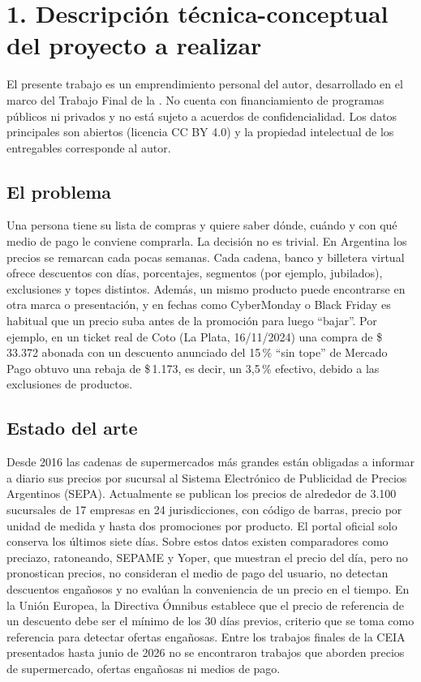 \documentclass[
11pt, %
]{charter}
\begin{document}
\section{1. Descripción técnica-conceptual del proyecto a realizar}
\label{sec:descripcion}

El presente trabajo es un emprendimiento personal del autor, desarrollado en el marco del Trabajo Final de la \degreename. No cuenta con financiamiento de programas públicos ni privados y no está sujeto a acuerdos de confidencialidad. Los datos principales son abiertos (licencia CC BY 4.0) y la propiedad intelectual de los entregables corresponde al autor.

\subsection{El problema}

Una persona tiene su lista de compras y quiere saber dónde, cuándo y con qué medio de pago le conviene comprarla. La decisión no es trivial. En Argentina los precios se remarcan cada pocas semanas. Cada cadena, banco y billetera virtual ofrece descuentos con días, porcentajes, segmentos (por ejemplo, jubilados), exclusiones y topes distintos. Además, un mismo producto puede encontrarse en otra marca o presentación, y en fechas como CyberMonday o Black Friday es habitual que un precio suba antes de la promoción para luego ``bajar''. Por ejemplo, en un ticket real de Coto (La Plata, 16/11/2024) una compra de \$\,33.372 abonada con un descuento anunciado del 15\,\% ``sin tope'' de Mercado Pago obtuvo una rebaja de \$\,1.173, es decir, un 3,5\,\% efectivo, debido a las exclusiones de productos.

\subsection{Estado del arte}

Desde 2016 las cadenas de supermercados más grandes están obligadas a informar a diario sus precios por sucursal al Sistema Electrónico de Publicidad de Precios Argentinos (SEPA). Actualmente se publican los precios de alrededor de 3.100 sucursales de 17 empresas en 24 jurisdicciones, con código de barras, precio por unidad de medida y hasta dos promociones por producto. El portal oficial solo conserva los últimos siete días. Sobre estos datos existen comparadores como preciazo, ratoneando, SEPAME y Yoper, que muestran el precio del día, pero no pronostican precios, no consideran el medio de pago del usuario, no detectan descuentos engañosos y no evalúan la conveniencia de un precio en el tiempo. En la Unión Europea, la Directiva Ómnibus establece que el precio de referencia de un descuento debe ser el mínimo de los 30 días previos, criterio que se toma como referencia para detectar ofertas engañosas. Entre los trabajos finales de la CEIA presentados hasta junio de 2026 no se encontraron trabajos que aborden precios de supermercado, ofertas engañosas ni medios de pago.
\end{document}
